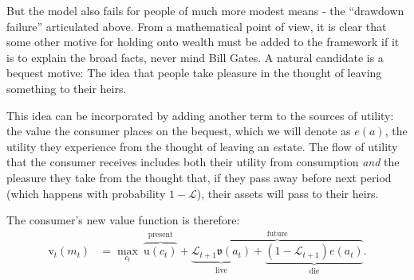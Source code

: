 \documentclass{article}
\newcommand{\uFunc}{\mathrm{u}}
\newcommand{\vFunc}{\mathrm{v}}
\newcommand{\Alive}{\mathcal{L}}
\newcommand{\cNrm}{c}
\newcommand{\mNrm}{m}
\newcommand{\aNrm}{a}
\newcommand{\bqstNrm}{e}
\begin{document}
But the model also fails for people of much more modest means - the ``drawdown failure'' articulated above.
From a mathematical point of view, it is clear that some other motive for holding onto wealth must be added to the framework if it is to explain the broad facts, never mind Bill Gates.
A natural candidate is a bequest motive: The idea that people take pleasure in the thought of leaving something to their heirs.

This idea can be incorporated by adding another term to the sources of utility: the value the consumer places on the bequest, which we will denote as $\bqstNrm(\aNrm)$, the utility they experience from the thought of leaving an $\bqstNrm$state.
The flow of utility that the consumer receives includes both their utility from consumption \textit{and} the pleasure they take from the thought that, if they pass away before next period (which happens with probability $1 -\Alive$), their assets will pass to their heirs.

The consumer's new value function is therefore:
\begin{align}
    {\vFunc}_{t}({\mNrm}_{t}) & = \max_{\cNrm_{t}} ~ \overbrace{\uFunc(\cNrm_{t})}^{\text{present}}+\overbrace{\underbrace{\Alive_{t+1}\mathfrak{v}(\aNrm_{t})}_{\text{live}} + \underbrace{(1-\Alive_{t+1})\bqstNrm({\aNrm}_{t})}_{\text{die}}
    }^{\text{future}}.
\end{align}
\end{document}
